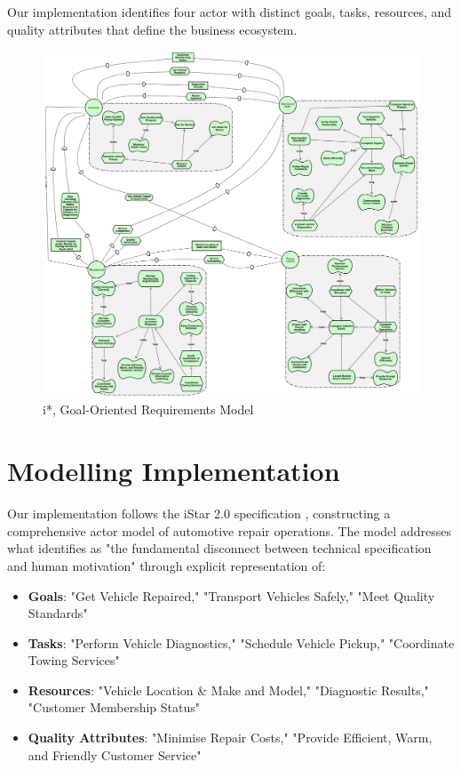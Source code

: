 \documentclass[14pt,a4paper]{article}
\begin{document}
Our implementation identifies four actor with distinct goals, tasks, resources, and quality attributes that define the business ecosystem.

\begin{figure}[ht]
  \hspace{-6.5em}
    \begin{minipage}[t]{1.3\textwidth}
        \includegraphics[width=\linewidth]{istar.png}
        \caption{i*, Goal-Oriented Requirements Model}
    \end{minipage}
\end{figure}

\section{Modelling Implementation}

Our implementation follows the iStar 2.0 specification \textit{\parencite[p. 344]{Dalpiaz2016}}, constructing a comprehensive actor model of automotive repair operations. The model addresses what \textit{\parencite[p. 87]{Sommerville2016}} identifies as "the fundamental disconnect between technical specification and human motivation" through explicit representation of:

\begin{itemize}
    \item \textbf{Goals}: "Get Vehicle Repaired," "Transport Vehicles Safely," "Meet Quality Standards"
    \item \textbf{Tasks}: "Perform Vehicle Diagnostics," "Schedule Vehicle Pickup," "Coordinate Towing Services"
    \item \textbf{Resources}: "Vehicle Location \& Make and Model," "Diagnostic Results," "Customer Membership Status"
    \item \textbf{Quality Attributes}: "Minimise Repair Costs," "Provide Efficient, Warm, and Friendly Customer Service"
\end{itemize}
\end{document}
